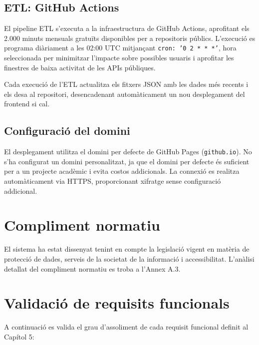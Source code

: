 \subsection{ETL: GitHub Actions}

El pipeline ETL s'executa a la infraestructura de GitHub Actions, aprofitant els 2.000 minuts mensuals gratuïts disponibles per a repositoris públics. L'execució es programa diàriament a les 02:00 UTC mitjançant \texttt{cron: '0 2 * * *'}, hora seleccionada per minimitzar l'impacte sobre possibles usuaris i aprofitar les finestres de baixa activitat de les APIs públiques.

Cada execució de l'ETL actualitza els fitxers JSON amb les dades més recents i els desa al repositori, desencadenant automàticament un nou desplegament del frontend si cal.

\subsection{Configuració del domini}

El desplegament utilitza el domini per defecte de GitHub Pages (\texttt{github.io}). No s'ha configurat un domini personalitzat, ja que el domini per defecte és suficient per a un projecte acadèmic i evita costos addicionals. La connexió es realitza automàticament via HTTPS, proporcionant xifratge sense configuració addicional.


\section{Compliment normatiu}

El sistema ha estat dissenyat tenint en compte la legislació vigent en matèria de protecció de dades, serveis de la societat de la informació i accessibilitat. L'anàlisi detallat del compliment normatiu es troba a l'Annex A.3.


\section{Validació de requisits funcionals}

A continuació es valida el grau d'assoliment de cada requisit funcional definit al Capítol 5:

